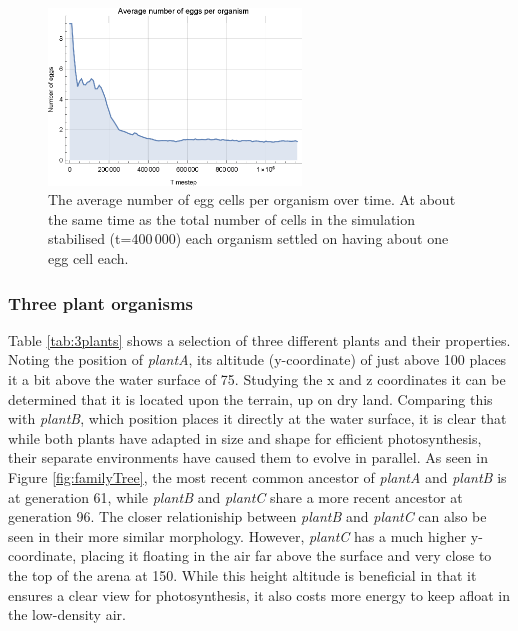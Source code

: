 \begin{figure}
  \begin{center}
  \includegraphics[width=0.6\textwidth]{figure/nEggs}
  \caption{
    The average number of egg cells per organism over time. At about the same time as the total number of cells in the simulation stabilised (t=400\,000) each organism settled on having about one egg cell each.
  }
  \label{fig:nEggs}
  \end{center}
\end{figure}

\subsubsection{Three plant organisms}\label{subsubsec:3plants}
Table \ref{tab:3plants} shows a selection of three different plants and their properties. Noting the position of \emph{plantA}, its altitude (y-coordinate) of just above 100 places it a bit above the water surface of 75. Studying the x and z coordinates it can be determined that it is located upon the terrain, up on dry land. Comparing this with \emph{plantB}, which position places it directly at the water surface, it is clear that while both plants have adapted in size and shape for efficient photosynthesis, their separate environments have caused them to evolve in parallel. As seen in Figure \ref{fig:familyTree}, the most recent common ancestor of \emph{plantA} and \emph{plantB} is at generation 61, while \emph{plantB} and \emph{plantC} share a more recent ancestor at generation 96. The closer relationiship between \emph{plantB} and \emph{plantC} can also be seen in their more similar morphology. However, \emph{plantC} has a much higher y-coordinate, placing it floating in the air far above the surface and very close to the top of the arena at 150. While this height altitude is beneficial in that it ensures a clear view for photosynthesis, it also costs more energy to keep afloat in the low-density air. 

